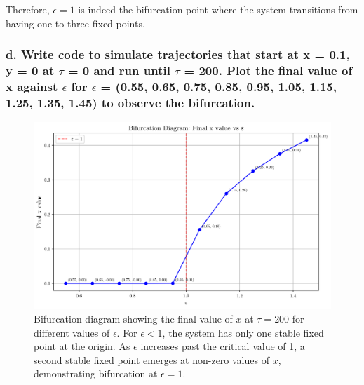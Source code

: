 \documentclass[12pt]{article}
\begin{document}
Therefore, $\epsilon = 1$ is indeed the bifurcation point where the system
transitions from having one to three fixed points.

\subsubsection*{d. Write code to simulate trajectories that start at x = 0.1, y
    = 0 at $\tau$ = 0 and run until $\tau$ = 200. Plot the final value of x against
    $\epsilon$ for $\epsilon$ = (0.55, 0.65, 0.75, 0.85, 0.95, 1.05, 1.15, 1.25,
    1.35, 1.45) to observe the bifurcation.}

\begin{figure}[h]
    \centering
    \includegraphics[width=1\textwidth]{figures/q3_plot.png}
    \caption{\centering Bifurcation diagram showing the final value of $x$ at $\tau=200$ for different values of $\epsilon$. For $\epsilon < 1$, the system has only one stable fixed point at the origin. As $\epsilon$ increases past the critical value of 1, a second stable fixed point emerges at non-zero values of $x$, demonstrating bifurcation at $\epsilon = 1$.}
\end{figure}
\end{document}
